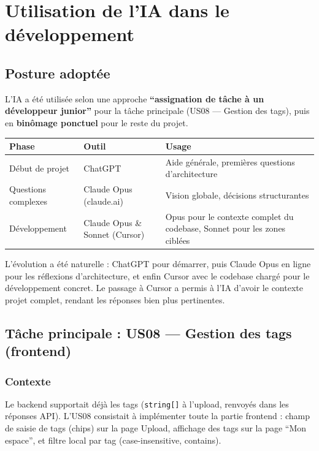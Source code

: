 \documentclass[12pt,a4paper]{article}
\begin{document}
\section{Utilisation de l'IA dans le d\'eveloppement}

\subsection{Posture adopt\'ee}

L'IA a \'et\'e utilis\'ee selon une approche \textbf{``assignation de t\^ache \`a un d\'eveloppeur junior''} pour la t\^ache principale (US08 --- Gestion des tags), puis en \textbf{bin\^omage ponctuel} pour le reste du projet.

\begin{longtable}{p{4cm} p{3.5cm} p{6.5cm}}
\toprule
\textbf{Phase} & \textbf{Outil} & \textbf{Usage} \\
\midrule
\endhead
D\'ebut de projet & ChatGPT & Aide g\'en\'erale, premi\`eres questions d'architecture \\
Questions complexes & Claude Opus (claude.ai) & Vision globale, d\'ecisions structurantes \\
D\'eveloppement & Claude Opus \& Sonnet (Cursor) & Opus pour le contexte complet du codebase, Sonnet pour les zones cibl\'ees \\
\bottomrule
\end{longtable}

L'\'evolution a \'et\'e naturelle : ChatGPT pour d\'emarrer, puis Claude Opus en ligne pour les r\'eflexions d'architecture, et enfin Cursor avec le codebase charg\'e pour le d\'eveloppement concret. Le passage \`a Cursor a permis \`a l'IA d'avoir le contexte projet complet, rendant les r\'eponses bien plus pertinentes.

\subsection{T\^ache principale : US08 --- Gestion des tags (frontend)}

\subsubsection{Contexte}

Le backend supportait d\'ej\`a les tags (\texttt{string[]} \`a l'upload, renvoy\'es dans les r\'eponses API). L'US08 consistait \`a impl\'ementer toute la partie frontend : champ de saisie de tags (chips) sur la page Upload, affichage des tags sur la page ``Mon espace'', et filtre local par tag (case-insensitive, contains).
\end{document}
